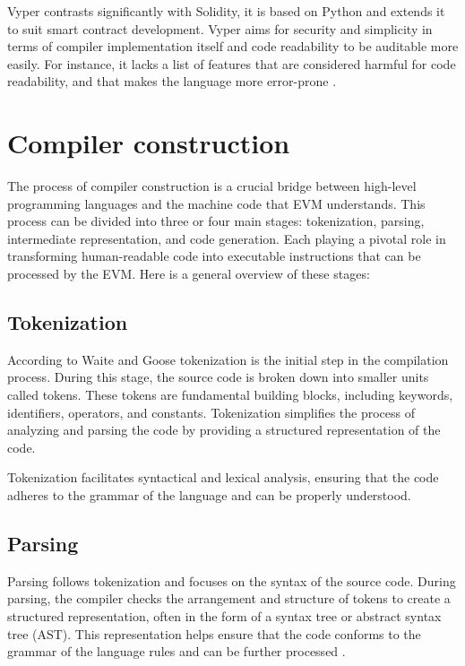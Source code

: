 Vyper contrasts significantly with Solidity, it is based on Python and extends it to suit smart contract development. Vyper aims for security and simplicity in terms of compiler implementation itself and code readability to be auditable more easily. For instance, it lacks a list of features that are considered harmful for code readability, and that makes the language more error-prone \cite{VyperDescription}.

\section{Compiler construction}
\label{sec:cc}

The process of compiler construction is a crucial bridge between high-level programming languages and the machine code that EVM understands. This process can be divided into three or four main stages: tokenization, parsing, intermediate representation, and code generation. Each playing a pivotal role in transforming human-readable code into executable instructions that can be processed by the EVM. Here is a general overview of these stages:

\subsection{Tokenization}
According to Waite and Goose \cite[135-148]{CompilerConstruction} tokenization is the initial step in the compilation process. During this stage, the source code is broken down into smaller units called tokens. These tokens are fundamental building blocks, including keywords, identifiers, operators, and constants. Tokenization simplifies the process of analyzing and parsing the code by providing a structured representation of the code.

Tokenization facilitates syntactical and lexical analysis, ensuring that the code adheres to the grammar of the language and can be properly understood.

\subsection{Parsing}

Parsing follows tokenization and focuses on the syntax of the source code. During parsing, the compiler checks the arrangement and structure of tokens to create a structured representation, often in the form of a syntax tree or abstract syntax tree (AST). This representation helps ensure that the code conforms to the grammar of the language rules and can be further processed \cite[149-182]{CompilerConstruction}.

